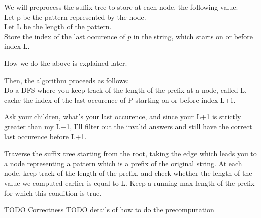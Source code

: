 \documentclass[11pt]{article}
\begin{document}
We will preprocess the suffix tree to store at each node, the following value:\\
Let p be the pattern represented by the node.\\
Let L be the length of the pattern.\\
Store the index of the last occurence of $p$ in the string, which starts on or before index L.

How we do the above is explained later.

Then, the algorithm proceeds as follows:\\



Do a DFS where you keep track of the length of the prefix at a node, called L,
cache the index of the last occurence of P starting on or before index L+1.

Ask your children, what's your last occurence, and since your L+1 is strictly greater than my L+1, I'll filter out the invalid answers and still have the correct last occurence before L+1.

Traverse the suffix tree starting from the root, taking the edge which leads you to a node representing a pattern which is a prefix of the original string.
At each node, keep track of the length of the prefix, and check whether the length of the value we computed earlier is equal to L.
Keep a running max length of the prefix for which this condition is true.


TODO Correctness
TODO details of how to do the precomputation
\end{document}
